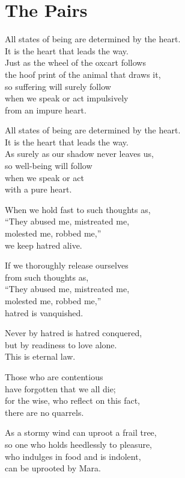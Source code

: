 
\chapter{The Pairs}

All states of being are determined by the heart.\\
It is the heart that leads the way.\\
Just as the wheel of the oxcart follows\\
the hoof print of the animal that draws it,\\
so suffering will surely follow\\
when we speak or act impulsively\\
from an impure heart.


All states of being are determined by the heart.\\
It is the heart that leads the way.\\
As surely as our shadow never leaves us,\\
so well-being will follow\\
when we speak or act\\
with a pure heart.


When we hold fast to such thoughts as,\\
“They abused me, mistreated me,\\
molested me, robbed me,”\\
we keep hatred alive.


If we thoroughly release ourselves\\
from such thoughts as,\\
“They abused me, mistreated me,\\
molested me, robbed me,”\\
hatred is vanquished.


Never by hatred is hatred conquered,\\
but by readiness to love alone.\\
This is eternal law.

Those who are contentious\\
have forgotten that we all die;\\
for the wise, who reflect on this fact,\\
there are no quarrels.

As a stormy wind can uproot a frail tree,\\
so one who holds heedlessly to pleasure,\\
who indulges in food and is indolent,\\
can be uprooted by Mara.


